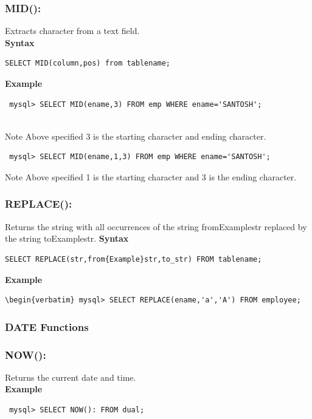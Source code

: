 \documentclass[11pt,a4paper]{article}
\begin{document}
\subsubsection*{MID():} Extracts character from a text field.\\

\textbf{Syntax}\\
\begin{verbatim}SELECT MID(column,pos) from tablename; \end{verbatim}

\textbf{Example}
\begin{verbatim} mysql> SELECT MID(ename,3) FROM emp WHERE ename='SANTOSH'; \end{verbatim}\\
Note Above specified 3 is the starting character and ending character.\\

\begin{verbatim} mysql> SELECT MID(ename,1,3) FROM emp WHERE ename='SANTOSH'; \end{verbatim}
Note Above specified 1 is the starting character and 3 is the ending character.
\subsubsection*{REPLACE():} Returns the string with all occurrences 
                       of the string from{Example}str replaced by the string to{Example}str.
\textbf{Syntax}
\begin{verbatim}SELECT REPLACE(str,from{Example}str,to_str) FROM tablename; \end{verbatim}

\textbf{Example}
\begin{verbatim}
\begin{verbatim} mysql> SELECT REPLACE(ename,'a','A') FROM employee;
\end{verbatim}

\subsubsection*{DATE Functions}

\subsubsection*{NOW():} Returns the current date and time.\\

\textbf{Example}
\begin{verbatim} mysql> SELECT NOW(): FROM dual; \end{verbatim}
\end{document}
